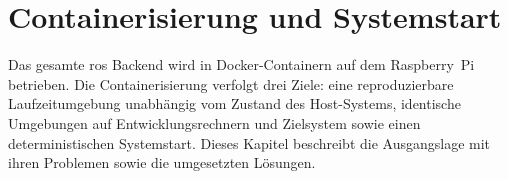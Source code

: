 \section{Containerisierung und Systemstart}
\label{sec:containerisierung_systemstart}
Das gesamte \gls{ros} Backend wird in Docker-Containern \cite{merkel2014docker} auf dem Raspberry~Pi betrieben. Die Containerisierung verfolgt drei Ziele: eine reproduzierbare Laufzeitumgebung unabhängig vom Zustand des Host-Systems, identische Umgebungen auf Entwicklungsrechnern und Zielsystem sowie einen deterministischen Systemstart. Dieses Kapitel beschreibt die Ausgangslage mit ihren Problemen sowie die umgesetzten Lösungen.

